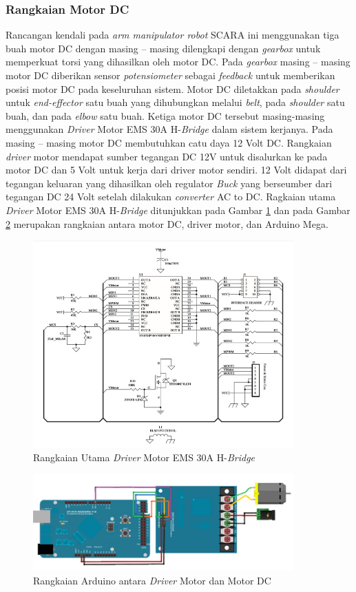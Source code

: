 \subsubsection{Rangkaian Motor DC}
Rancangan kendali pada \textit{arm manipulator robot} SCARA ini menggunakan tiga buah motor DC dengan masing – masing dilengkapi dengan \textit{gearbox} untuk memperkuat torsi yang dihasilkan oleh motor DC. Pada  \textit{gearbox} masing – masing motor  DC diberikan sensor \textit{potensiometer} sebagai \textit{feedback} untuk memberikan posisi motor DC pada keseluruhan sistem. Motor DC diletakkan pada \textit{shoulder} untuk \textit{end-effector} satu buah yang dihubungkan melalui \textit{belt}, pada \textit{shoulder} satu buah, dan pada \textit{elbow} satu buah. Ketiga motor DC tersebut masing-masing menggunakan \textit{Driver} Motor EMS 30A H-\textit{Bridge} dalam sistem kerjanya. Pada masing – masing motor DC membutuhkan catu daya 12 Volt DC. Rangkaian \textit{driver} motor mendapat sumber tegangan DC 12V untuk disalurkan ke pada motor DC dan 5 Volt untuk kerja dari driver motor sendiri. 12 Volt didapat dari tegangan keluaran yang dihasilkan oleh regulator \textit{Buck} yang berseumber dari tegangan DC 24 Volt setelah dilakukan \textit{converter} AC to DC. Ragkaian utama \textit{Driver} Motor EMS 30A H-\textit{Bridge} ditunjukkan pada Gambar \ref{pic.drivermotor} dan pada Gambar \ref{pic.motordcdriver} merupakan rangkaian antara motor DC, driver motor, dan Arduino Mega.  
\begin{figure}[H]
	\centering
	\includegraphics[width=10cm]{gambar/rangakaiandriver.jpg}
	\caption{Rangkaian Utama \textit{Driver} Motor EMS 30A H-\textit{Bridge}}
	\label{pic.drivermotor}
\end{figure}
\begin{figure}[H]
	\centering
	\includegraphics[width=10cm]{gambar/drivermotor.jpg}
	\caption{Rangkaian Arduino antara \textit{Driver} Motor dan Motor DC}
	\label{pic.motordcdriver}
\end{figure}

